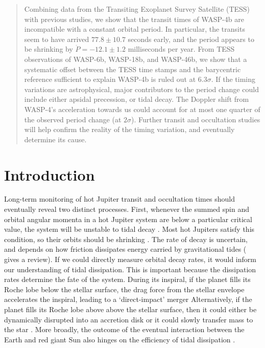 \documentclass[12pt,twocolumn,tighten]{aastex62}
\begin{document}
\begin{abstract}
  Combining data from the Transiting Exoplanet Survey Satellite (TESS)
  with previous studies, we show that the transit times of WASP-4b are
  incompatible with a constant orbital period. 
  In particular, the transits seem to have arrived $77.8 \pm 10.7$
  seconds early, and the period appears to be shrinking by
  $\dot{P}=-12.1 \pm 1.2$ milliseconds per year.   
  From TESS observations of WASP-6b, WASP-18b, and WASP-46b, we show
  that a systematic offset between the TESS time stamps and the barycentric
  reference sufficient to explain WASP-4b is ruled out at 6.3$\sigma$.
  If the timing variations are astrophysical,
  major contributors to the period change could include either
  apsidal precession, or tidal decay.
  The Doppler shift from WASP-4's acceleration towards us could
  account for at most one quarter of the observed period change
  (at $2\sigma$).
  Further transit and occultation studies will help confirm the
  reality of the timing variation, and eventually determine its cause.
\end{abstract}


\section{Introduction}
\label{sec:intro}

Long-term monitoring of hot Jupiter transit and occultation times
should eventually reveal two distinct processes.  First, whenever the
summed spin and orbital angular momenta in a hot Jupiter system are
below a particular critical value, the system will be unstable to
tidal decay \citep{counselman_outcomes_1973,hut_stability_1980}.  Most
hot Jupiters satisfy this condition, so their orbits should be
shrinking \citep{levrard_falling_2009,matsumura_tidal_2010}.  The rate
of decay is uncertain, and depends on how friction dissipates energy
carried by gravitational tides (\citealt{ogilvie_tidal_2014} gives a
review).  If we could directly measure orbital decay rates, it would
inform our understanding of tidal dissipation.  This is important
because the dissipation rates determine the fate of the system.
During its inspiral, if the planet fills its Roche lobe below the
stellar surface, the drag force from the stellar envelope accelerates
the inspiral, leading to a `direct-impact' merger
\citep{metzger_optical_2012,macleod_planetary_2018} Alternatively, if
the planet fills its Roche lobe above above the stellar surface, then
it could either be dynamically disrupted into an accretion disk or it
could slowly transfer mass to the star \citep{metzger_optical_2012}.
More broadly, the outcome of the eventual interaction between the
Earth and red giant Sun also hinges on the efficiency of tidal
dissipation \citep{rasio_tidal_1996}.
\end{document}
